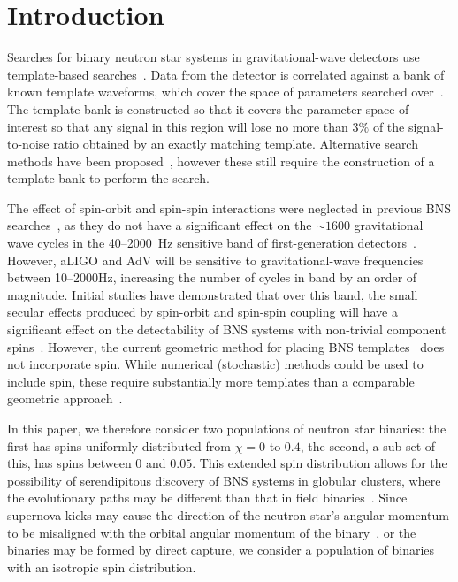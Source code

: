 \maketitle

\section{Introduction}
Searches
for binary neutron star systems in gravitational-wave detectors use
template-based searches~\cite{Allen:2005fk}. Data from the detector is
correlated against a bank of known template waveforms, which cover the space
of parameters searched over~\cite{OwenSathyaprakash98}. The template bank is
constructed so that it covers the parameter space of interest
so that any signal in this region will lose no more
than $3\%$ of the signal-to-noise ratio obtained by an exactly matching
template. Alternative search methods have been proposed~\cite{Marion:2004,Cannon:2010qh},
however these still require the construction of a template bank to perform the
search.

The effect of spin-orbit and spin-spin interactions were neglected in previous
BNS searches~\cite{Abadie:2011nz}, as they do not have a significant effect on
the $\sim 1600$ gravitational wave cycles in the 40--2000~Hz sensitive band of
first-generation detectors~\cite{Apostolatos:1996rf}. However, aLIGO and AdV
will be sensitive to gravitational-wave frequencies between 10--2000Hz,
increasing the number of cycles in band by an order of magnitude.
Initial studies have demonstrated that over this band, the small secular
effects produced by spin-orbit and spin-spin coupling will have a significant
effect on the detectability of BNS systems with non-trivial component
spins~\cite{Ajith:2011ec}. However, the current geometric method for placing
BNS templates~\cite{Bank06} does not incorporate spin. While numerical
(stochastic) methods could be used to include spin, these require
substantially more templates than a comparable geometric
approach~\cite{Harry:2009ea}. 

In this paper, we therefore consider two populations of neutron star
binaries: the first has spins uniformly distributed from $\chi = 0$ to $0.4$,
the second, a sub-set of this, has spins between $0$ and $0.05$.  This extended spin
distribution allows for the possibility of serendipitous discovery of BNS
systems in globular clusters, where the evolutionary paths may be different
than that in field binaries~\cite{Grindlay:2005ym}. Since supernova kicks may
cause the direction of the neutron star's angular momentum to be misaligned
with the orbital angular momentum of the binary~\cite{Farr:2011gs}, or the
binaries may be formed by direct capture, we consider  a population of
binaries with an isotropic spin distribution.


